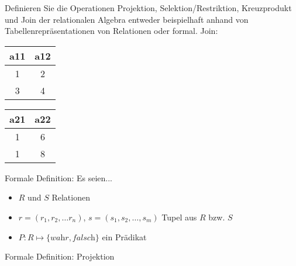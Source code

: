 \begin{frame}{Definieren Sie die Operationen Projektion, Selektion/Restriktion, Kreuzprodukt und Join der relationalen Algebra entweder beispielhaft anhand von Tabellenrepräsentationen von Relationen oder formal.}
Join: 
\newline
\newline
\begin{tabular}{ | c | c | }
	\hline
	a11 	& 		a12		\\
	\hline
	1 		& 		2 		\\
	\hline
	3 		& 		4 		\\
	\hline
\end{tabular}
\begin{tabular}{ | c | c | }
	\hline
	a21 	&		a22	\\
	\hline
	1 		& 		6 		\\
	\hline
	1 		& 		8 		\\
	\hline
\end{tabular}
\end{frame}

\begin{frame}{Formale Definition: Es seien...}
\begin{itemize}
\item $R$ und $S$ Relationen
\item $r = (r_1, r_2, \ldots r_n)$, $s = (s_1, s_2, \ldots, s_m)$ Tupel aus $R$ bzw. $S$
\item $P: R \mapsto \{\textit{wahr}, \textit{falsch}\}$ ein Prädikat
\end{itemize}
\end{frame}

\begin{frame}{Formale Definition: Projektion}
\end{frame}

